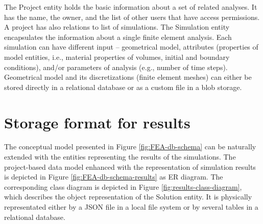 The Project entity holds the basic information about a set of related analyses. It has the name, the owner, and the list of other users that have access permissions. A project has also relations to list of simulations. The Simulation entity encapsulates the information about a single finite element analysis. Each simulation can have different input -- geometrical model, attributes (properties of model entities, i.e., material properties of volumes, initial and boundary conditions), and/or parameters of analysis (e.g., number of time steps). Geometrical model and its discretizations (finite element meshes) can either be stored directly in a relational database or as a custom file in a blob storage.


\section{Storage format for results}
\label{sec:storage-format}


The conceptual model presented in Figure \ref{fig:FEA-db-schema} can be naturally extended with the entities representing the results of the simulations. The project-based data model enhanced with the representation of simulation results is depicted in Figure \ref{fig:FEA-db-schema-results} as ER diagram. The corresponding class diagram is depicted in Figure \ref{fig:results-class-diagram}, which describes the object representation of the Solution entity. It is physically representated either by a JSON file in a local file system or by several tables in a relational database.

